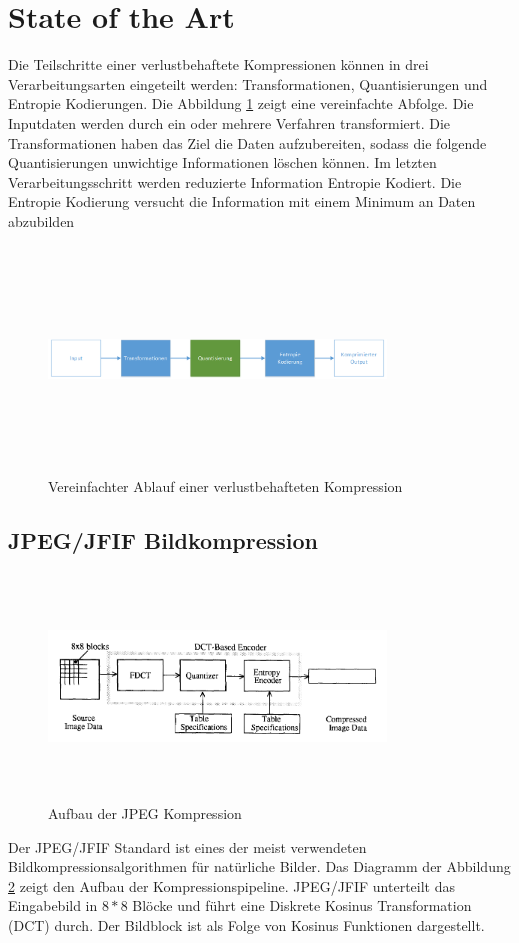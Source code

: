 \section{State of the Art}
Die Teilschritte einer verlustbehaftete Kompressionen können in drei Verarbeitungsarten eingeteilt werden: Transformationen, Quantisierungen und Entropie Kodierungen. Die Abbildung \ref{state:aufbau} zeigt eine vereinfachte Abfolge. Die Inputdaten werden durch ein oder mehrere Verfahren transformiert. Die Transformationen haben das Ziel die Daten aufzubereiten, sodass die folgende Quantisierungen unwichtige Informationen löschen können. Im letzten Verarbeitungsschritt werden reduzierte Information Entropie Kodiert. Die Entropie Kodierung versucht die Information mit einem Minimum an Daten abzubilden\\
\begin{figure}[!htbp]
	\center
	\includegraphics[width=0.8\textwidth,height=6cm,keepaspectratio]{./pictures/state/aufbau.png}
	\caption{Vereinfachter Ablauf einer verlustbehafteten Kompression}
	\label{state:aufbau}
\end{figure}

\subsection{JPEG/JFIF Bildkompression}
\begin{figure}[!htbp]
	\center
	\includegraphics[width=0.8\textwidth,height=6cm,keepaspectratio]{./pictures/state/jpeg.png}
	\caption{Aufbau der JPEG Kompression \cite{wallace1992jpeg}}
	\label{state:jpeg:abb}
\end{figure}
Der JPEG/JFIF Standard\cite{wallace1992jpeg} ist eines der meist verwendeten Bildkompressionsalgorithmen für natürliche Bilder. Das Diagramm der Abbildung \ref{state:jpeg:abb} zeigt den Aufbau der Kompressionspipeline. JPEG/JFIF unterteilt das Eingabebild in $8*8$ Blöcke und führt eine Diskrete Kosinus Transformation (DCT) durch. Der Bildblock ist als Folge von Kosinus Funktionen dargestellt.

